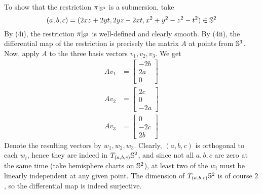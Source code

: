 \documentclass[a4paper, 12pt]{article}
\begin{document}
\begin{Exercise}
\begin{enumerate}[label=(\roman*)]
            To show that the restriction $\pi|_{\S^3}$ is a submersion, take
            \[
                (a, b, c) = (2xz + 2yt, 2yz - 2xt, x^2 + y^2 - z^2 - t^2) \in \S^2
            \]
            By (4i), the restriction $\pi|_{\S^3}$ is well-defined and clearly smooth.
            By (4ii), the differential map of the restriction is precisely the matrix $A$ at points from $\S^3$.
            Now, apply $A$ to the three basis vectors $v_1, v_2, v_3$.
            We get
            \begin{align*}
                A v_1 &=
                \begin{bmatrix}
                    -2b \\
                    2a \\
                    0
                \end{bmatrix} \\
                A v_2 &=
                \begin{bmatrix}
                    2c \\
                    0 \\
                    -2a
                \end{bmatrix} \\
                A v_3 &=
                \begin{bmatrix}
                    0 \\
                    -2c \\
                    2b
                \end{bmatrix}
            \end{align*}
            Denote the resulting vectors by $w_1, w_2, w_3$.
            Clearly, $(a, b, c)$ is orthogonal to each $w_i$, hence they are indeed in $T_{(a, b, c)}\S^2$,
            and since not all $a, b, c$ are zero at the same time (take hemisphere charts on $\S^2$),
            at least two of the $w_i$ must be linearly independent at any given point.
            The dimension of $T_{(a,b,c)}\S^2$ is of course $2$, so the differential map is indeed surjective.
    \end{enumerate}
\end{Exercise}
\end{document}
